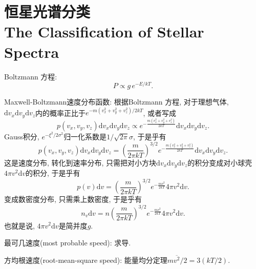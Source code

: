 \chapter{恒星光谱分类\\The Classification of Stellar Spectra}

Boltzmann 方程:
\begin{equation*}
    P \propto g\,e^{-E/kT}.
\end{equation*}

Maxwell-Boltzmann速度分布函数: 根据Boltzmann 方程, 对于理想气体, $\mathrm{d}v_x\mathrm{d}v_y\mathrm{d}v_z$内的概率正比于$e^{-m(v_x^2+v_y^2+v_z^2)/2kT}$, 或者写成
\begin{equation*}
    p(v_x,v_y,v_z) \mathrm{d}v_x\mathrm{d}v_y\mathrm{d}v_z \propto e^{-\frac{m(v_x^2+v_y^2+v_z^2)}{2kT}} \mathrm{d}v_x\mathrm{d}v_y\mathrm{d}v_z.
\end{equation*}
Gauss积分, $e^{-\xi^2/2\sigma^2}$归一化系数是$1/\sqrt{2\pi}\sigma$, 于是乎有
\begin{equation*}
    p(v_x,v_y,v_z) \mathrm{d}v_x\mathrm{d}v_y\mathrm{d}v_z = \left(\frac{m}{2\pi kT}\right)^{3/2} e^{-\frac{m(v_x^2+v_y^2+v_z^2)}{2kT}} \mathrm{d}v_x\mathrm{d}v_y\mathrm{d}v_z.
\end{equation*}
这是速度分布, 转化到速率分布, 只需把对小方块$\mathrm{d}v_x\mathrm{d}v_y\mathrm{d}v_z$的积分变成对小球壳$4\pi v^2\mathrm{d}v$的积分, 于是乎有
\begin{equation*}
    p(v) \mathrm{d}v = \left(\frac{m}{2\pi kT}\right)^{3/2} e^{-\frac{mv^2}{2kT}} 4\pi v^2\mathrm{d}v.
\end{equation*}
变成数密度分布, 只需乘上数密度, 于是乎有
\begin{equation*}
    n_v \mathrm{d}v = n \left(\frac{m}{2\pi kT}\right)^{3/2} e^{-\frac{mv^2}{2kT}} 4\pi v^2\mathrm{d}v.
\end{equation*}
也就是说, $4\pi v^2\mathrm{d}v$是简并度$g$.

最可几速度(most probable speed): 求导.

方均根速度(root-mean-square speed): 能量均分定理$m\overline{v^2} /2=3(kT/2)$. 


